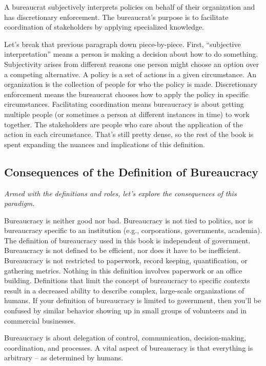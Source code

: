A \gls{bureaucrat} \iftoggle{glossaryinmargin}{\marginpar{[Glossary]}}{}
subjectively interprets policies on behalf of their organization and has discretionary enforcement. The bureaucrat's purpose is to facilitate coordination of stakeholders by applying specialized knowledge. 

Let's break that previous paragraph down piece-by-piece. First, ``subjective interpretation'' means a person is making a decision about how to do something. Subjectivity arises from different reasons one person might choose an option over a competing alternative.  A \gls{policy} \iftoggle{glossaryinmargin}{\marginpar{[Glossary]}}{}
is a set of actions in a given circumstance. An \gls{organization} is the collection of people for who the policy is made. Discretionary enforcement means the bureaucrat chooses how to apply the policy in specific circumstances. Facilitating coordination means bureaucracy is about getting multiple people (or sometimes a person at different instances in time) to work together. The stakeholders are people who care about the application of the action in each circumstance.  That's still pretty dense, so the rest of the book is spent expanding the nuances and implications of this definition.

\subsection*{Consequences of the Definition of Bureaucracy}

\textit{Armed with the definitions and roles, let's explore the consequences of this paradigm.}

Bureaucracy is neither good nor bad. Bureaucracy is not tied to politics, nor is bureaucracy specific to an institution (e.g., corporations, governments, academia). The definition of bureaucracy used in this book is independent of government. Bureaucracy is not defined to be efficient, nor does it have to be inefficient. Bureaucracy is not restricted to paperwork, record keeping, quantification, or gathering metrics. Nothing in this definition involves paperwork or an office building. Definitions that limit the concept of bureaucracy to specific contexts result in a decreased ability to describe complex, large-scale organizations of humans. If your definition of bureaucracy is limited to government, then you'll be confused by similar behavior showing up in small groups of volunteers and in commercial businesses.

Bureaucracy is about delegation of control, communication, decision-making, coordination, and processes. 
A vital aspect of bureaucracy is that everything is arbitrary -- as determined by humans.



